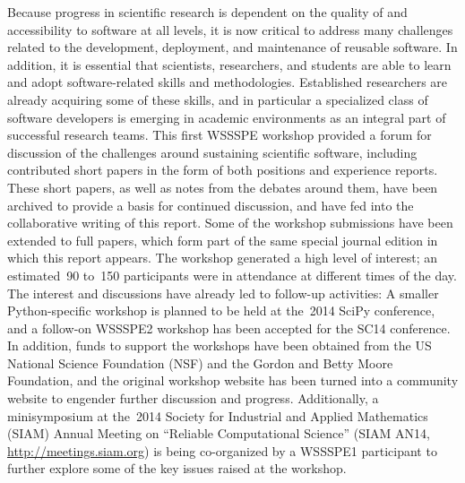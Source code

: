 \documentclass[11pt, oneside]{amsart}
\newcommand{\note}[1]{ {\textcolor{red}    { #1 }}}
\begin{document}
Because progress in scientific research is dependent on the quality of
and accessibility to software at all levels, it is now critical to
address many challenges related to the development, deployment, and
maintenance of reusable software.
In addition, it is essential that scientists, researchers, and
students are able to learn and adopt software-related skills and
methodologies. Established researchers are already acquiring some of
these skills, and in particular a specialized class of software
developers is emerging in academic environments as an integral part of
successful research teams. This first WSSSPE workshop provided a forum
for discussion of the challenges around sustaining scientific
software, including contributed short papers in the form of both
positions and experience reports. These short papers, as well as notes
from the debates around them, have been archived to provide a basis
for continued discussion, and have fed into the collaborative writing
of this report.  Some of the workshop submissions have been extended
to full papers, which form part of the same special journal edition in
which this report appears. The workshop generated a high level of
interest; an estimated~90 to~150 participants were in attendance at
different times of the day. The interest and discussions have already
led to follow-up activities: A smaller Python-specific workshop is
planned to be held at the~2014 SciPy conference, and a follow-on
WSSSPE2 workshop has been accepted for
the SC14 conference. In addition, funds to support the workshops have
been obtained from the US National Science Foundation (NSF) and the
Gordon and Betty Moore Foundation, and the original workshop website
has been turned into a community website to engender further
discussion and progress. Additionally, a minisymposium at the~2014
Society for Industrial and Applied Mathematics (SIAM) Annual Meeting
on ``Reliable Computational Science'' (SIAM AN14,
\url{http://meetings.siam.org}) is being co-organized by a WSSSPE1
participant to further explore some of the key issues raised at the
workshop.
\end{document}
